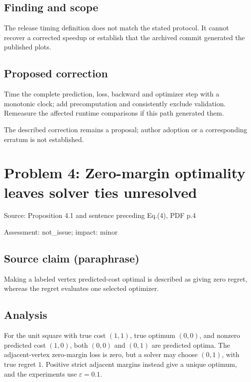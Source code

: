 \documentclass[11pt]{article}
\begin{document}
\subsection*{Finding and scope}

The release timing definition does not match the stated protocol. It cannot recover a corrected speedup or establish that the archived commit generated the published plots.

\subsection*{Proposed correction}

Time the complete prediction, loss, backward and optimizer step with a monotonic clock; add precomputation and consistently exclude validation. Remeasure the affected runtime comparisons if this path generated them.

The described correction remains a proposal; author adoption or a corresponding erratum is not established.

\section*{Problem 4: Zero-margin optimality leaves solver ties unresolved}

Source: Proposition 4.1 and sentence preceding Eq.(4), PDF p.4

Assessment: not\_issue; impact: minor

\subsection*{Source claim (paraphrase)}

Making a labeled vertex predicted-cost optimal is described as giving zero regret, whereas the regret evaluates one selected optimizer.

\subsection*{Analysis}

For the unit square with true cost \((1,1)\), true optimum \((0,0)\), and nonzero predicted cost \((1,0)\), both \((0,0)\) and \((0,1)\) are predicted optima. The adjacent-vertex zero-margin loss is zero, but a solver may choose \((0,1)\), with true regret \(1\). Positive strict adjacent margins instead give a unique optimum, and the experiments use \(\varepsilon=0.1\).
\end{document}
